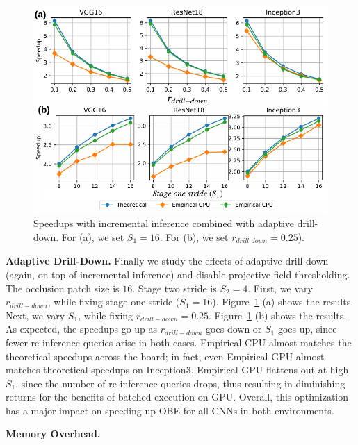 \begin{figure}[t]
\includegraphics[width=\columnwidth]{images/5_2_3_edited}
\vspace{-8mm}
\caption{Speedups with incremental inference combined with adaptive drill-down. For (a), we set $S_1=16$. For (b), we set $r_{drill\_down}=0.25$).}
\vspace{-2mm}
\label{fig:5_2_3_edited}
\end{figure}

\vspace{2mm}
\noindent \textbf{Adaptive Drill-Down.} Finally we study the effects of adaptive drill-down (again, on top of incremental inference) and disable projective field thresholding. The occlusion patch size is $16$. Stage two stride is $S_2 = 4$. First, we vary $r_{drill-down}$, while fixing stage one stride ($S_1 = 16$). Figure~\ref{fig:5_2_3_edited} (a) shows the results. Next, we vary $S_1$, while fixing $r_{drill-down} = 0.25$. Figure~\ref{fig:5_2_3_edited} (b) shows the results. As expected, the speedups go up as $r_{drill-down}$ goes down or $S_1$ goes up, since fewer re-inference queries arise in both cases. Empirical-CPU almost matches the theoretical speedups across the board; in fact, even Empirical-GPU almost matches theoretical speedups on Inception3. Empirical-GPU flattens out at high $S_1$, since the number of re-inference queries drops, thus resulting in diminishing returns for the benefits of batched execution on GPU. Overall, this optimization has a major impact on speeding up OBE for all CNNs in both environments.


\vspace{2mm}
\noindent \textbf{Memory Overhead.} 


